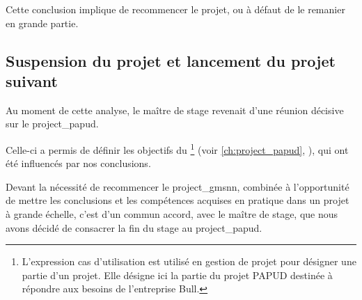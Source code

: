 Cette conclusion implique de recommencer le projet, ou à défaut de le remanier en grande partie.

\subsection{Suspension du projet et lancement du projet suivant}
Au moment de cette analyse, le maître de stage revenait d'une réunion décisive sur le \gls{project_papud}.

Celle-ci a permis de définir les objectifs du \footnote{L'expression \og cas d'utilisation\fg{} est utilisé en gestion de projet pour désigner une partie d'un projet. Elle désigne ici la partie du projet PAPUD destinée à répondre aux besoins de l'entreprise Bull.} (voir \autoref{ch:project_papud}, ), qui ont été influencés par nos conclusions.

Devant la nécessité de recommencer le \gls{project_gmsnn}, combinée à l'opportunité de mettre les conclusions et les compétences acquises en pratique dans un projet à grande échelle, c'est d'un commun accord, avec le maître de stage, que nous avons décidé de consacrer la fin du stage au \gls{project_papud}.


